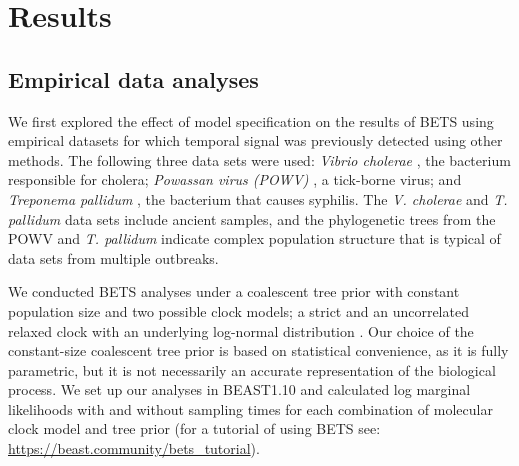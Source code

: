 \documentclass[10pt,letterpaper]{article}
\begin{document}
\section*{Results}
\subsection*{Empirical data analyses}
We first explored the effect of model specification on the results of BETS using empirical datasets for which temporal signal was previously detected using other methods. The following three data sets were used: \textit{Vibrio cholerae} \cite{devault2014second}, the bacterium responsible for cholera; \textit{Powassan virus (POWV)} \cite{majander2020ancient}, a tick-borne virus; and \textit{Treponema pallidum} \cite{vogels2023phylogeographic}, the bacterium that causes syphilis. The \textit{V. cholerae} and \textit{T. pallidum} data sets include ancient samples, and the phylogenetic trees from the POWV and \textit{T. pallidum} indicate complex population structure that is typical of data sets from multiple outbreaks. 

We conducted BETS analyses under a coalescent tree prior with constant population size and two possible clock models; a strict and an uncorrelated relaxed clock with an underlying log-normal distribution \cite{drummond2006relaxed}. Our choice of the constant-size coalescent tree prior is based on statistical convenience, as it is fully parametric, but it is not necessarily an accurate representation of the biological process. We set up our analyses in BEAST1.10 \cite{suchard2018bayesian} and calculated log marginal likelihoods with and without sampling times for each combination of molecular clock model and tree prior (for a tutorial of using BETS see: \url{https://beast.community/bets\_tutorial}). 
\end{document}
